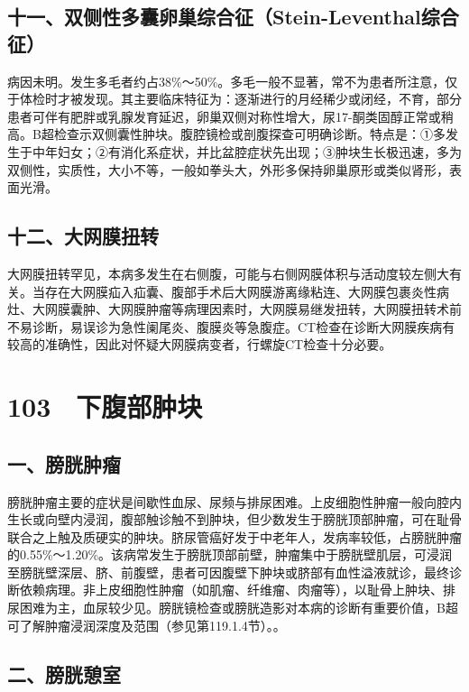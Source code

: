 \subsection{十一、双侧性多囊卵巢综合征（Stein-Leventhal综合征）}

病因未明。发生多毛者约占38\%～50\%。多毛一般不显著，常不为患者所注意，仅于体检时才被发现。其主要临床特征为：逐渐进行的月经稀少或闭经，不育，部分患者可伴有肥胖或乳腺发育延迟，卵巢双侧对称性增大，尿17-酮类固醇正常或稍高。B超检查示双侧囊性肿块。腹腔镜检或剖腹探查可明确诊断。特点是：①多发生于中年妇女；②有消化系症状，并比盆腔症状先出现；③肿块生长极迅速，多为双侧性，实质性，大小不等，一般如拳头大，外形多保持卵巢原形或类似肾形，表面光滑。

\subsection{十二、大网膜扭转}

大网膜扭转罕见，本病多发生在右侧腹，可能与右侧网膜体积与活动度较左侧大有关。当存在大网膜疝入疝囊、腹部手术后大网膜游离缘粘连、大网膜包裹炎性病灶、大网膜囊肿、大网膜肿瘤等病理因素时，大网膜易继发扭转，大网膜扭转术前不易诊断，易误诊为急性阑尾炎、腹膜炎等急腹症。CT检查在诊断大网膜疾病有较高的准确性，因此对怀疑大网膜病变者，行螺旋CT检查十分必要。

\protect\hypertarget{text00234.html}{}{}

\section{103　下腹部肿块}

\subsection{一、膀胱肿瘤}

膀胱肿瘤主要的症状是间歇性血尿、尿频与排尿困难。上皮细胞性肿瘤一般向腔内生长或向壁内浸润，腹部触诊触不到肿块，但少数发生于膀胱顶部肿瘤，可在耻骨联合之上触及质硬实的肿块。脐尿管癌好发于中老年人，发病率较低，占膀胱肿瘤的0.55\%～1.20\%。该病常发生于膀胱顶部前壁，肿瘤集中于膀胱壁肌层，可浸润至膀胱壁深层、脐、前腹壁，患者可因腹壁下肿块或脐部有血性溢液就诊，最终诊断依赖病理。非上皮细胞性肿瘤（如肌瘤、纤维瘤、肉瘤等），以耻骨上肿块、排尿困难为主，血尿较少见。膀胱镜检查或膀胱造影对本病的诊断有重要价值，B超可了解肿瘤浸润深度及范围（参见第119.1.4节）。。

\subsection{二、膀胱憩室}

